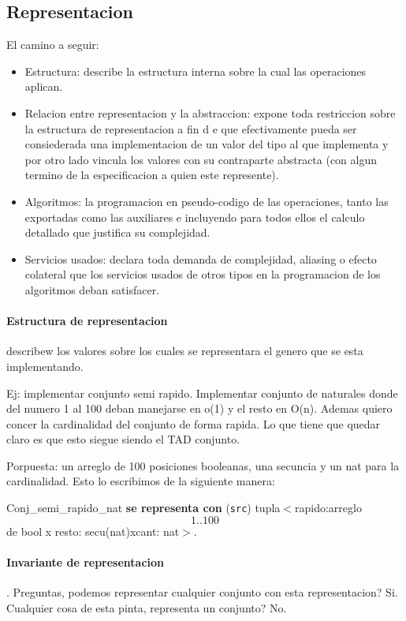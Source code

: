 \documentclass[11pt]{article}
\begin{document}
\subsection{Representacion}
El camino a seguir:
\begin{itemize}
    \item Estructura: describe la estructura interna sobre la cual las operaciones aplican.
    \item Relacion entre representacion y la abstraccion: expone toda restriccion sobre
        la estructura de representacion a fin d e que efectivamente pueda ser consiederada
        una implementacion de un valor del tipo al que implementa y por otro lado
        vincula los valores con su contraparte abstracta (con algun termino de la especificacion
        a quien este represente).
    \item Algoritmos: la programacion en pseudo-codigo de las operaciones, tanto
        las exportadas como las auxiliares e incluyendo para todos ellos el calculo
        detallado que justifica su complejidad.
    \item Servicios usados: declara toda demanda de complejidad, aliasing o efecto
        colateral que los servicios usados de otros tipos en la programacion de
        los algoritmos deban satisfacer.
\end{itemize}

\paragraph{Estructura de representacion} describew los valores sobre los cuales
se representara el genero que se esta implementando.

Ej: implementar conjunto semi rapido. Implementar conjunto de naturales donde
del numero 1 al 100 deban manejarse en o(1) y el resto en O(n). Ademas quiero
concer la cardinalidad del conjunto de forma rapida.
Lo que tiene que quedar claro es que esto siegue siendo el TAD conjunto.

Porpuesta: un arreglo de 100 posiciones booleanas, una secuncia y un nat para la
cardinalidad.
Esto lo escribimos de la siguiente manera:

Conj\_semi\_rapido\_nat  \textbf{se representa con} (\texttt{src})
tupla$<$rapido:arreglo \[1..100\] de bool x resto: secu(nat)xcant: nat$>$.

\paragraph{Invariante de representacion}.
Preguntas, podemos representar cualquier conjunto con esta representacion? Si.
Cualquier cosa de esta pinta, representa un conjunto? No.
\end{document}
